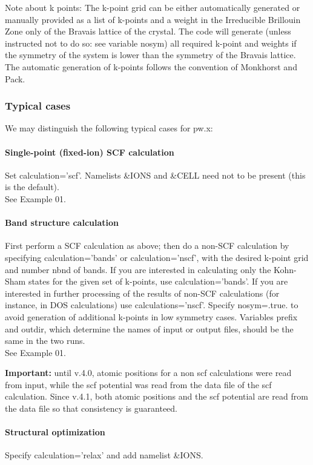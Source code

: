 \documentclass[12pt,a4paper]{article}
\begin{document}
Note about k points: The k-point grid can be either automatically generated 
or manually provided as a list of k-points and a weight in the Irreducible
Brillouin Zone only of the Bravais lattice of the crystal. The code will 
generate (unless instructed not to do so: see variable nosym) all
required k-point 
and weights if the symmetry of the system is lower than the symmetry of the
Bravais lattice. The automatic generation of k-points follows the convention
of Monkhorst and Pack.

\subsubsection{Typical cases}
We may distinguish the following typical cases for pw.x:

\paragraph{Single-point (fixed-ion) SCF calculation} 
Set calculation='scf'.
Namelists \&IONS and \&CELL need not to be present (this is the default).\\
See Example 01.

\paragraph{Band structure calculation}
First perform a SCF calculation as above;
then do a non-SCF calculation by specifying calculation='bands' or
calculation='nscf', with the desired k-point grid and number nbnd
of bands. If you are interested in calculating only the Kohn-Sham states
for the given set of k-points, use calculation='bands'. If you are
interested in further processing of the results of non-SCF calculations
(for instance, in DOS calculations) use calculations='nscf'.
Specify nosym=.true. to avoid generation of additional k-points in
low symmetry cases. Variables prefix and outdir, which determine
the names of input or output files, should be the same in the two runs.\\
See Example 01.

{\bf Important:} until v.4.0, atomic positions for a non scf calculations 
were read from input, while the scf potential was read from the data file
of the scf calculation. Since v.4.1, both atomic positions and the scf
potential are read from the data file so that consistency is guaranteed.

\paragraph{Structural optimization}
Specify calculation='relax' and add namelist \&IONS.
\end{document}
